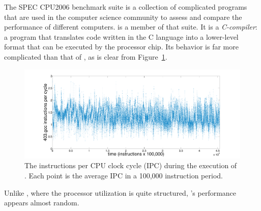 The SPEC CPU2006 benchmark suite \cite{spec} is a collection of
complicated programs that are used in the computer science community
to assess and compare the performance of different computers.  \gcc is
a member of that suite.
% 
% 
It is a \emph{C-compiler}: a program that translates code written in the
C language into a lower-level format that can be executed by the
processor chip.  Its behavior is far more complicated than that of
\col, as is clear from Figure~\ref{fig:gcc-ts}.
  \begin{figure}[t]
  \centering
    \includegraphics[width=\columnwidth]{figs/gccfullts}
    \caption{The instructions per CPU clock cycle (IPC) during the
      execution of \gcc. Each point is the average IPC in a 100,000
      instruction period.}
    \label{fig:gcc-ts}
  \end{figure}
Unlike \col, where the processor utilization is quite structured,
\gcc's performance appears almost random.

